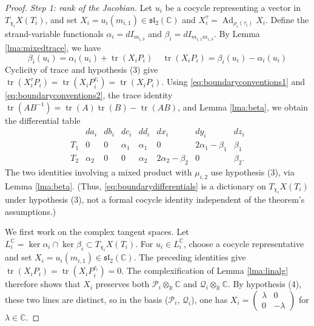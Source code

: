 \documentclass{article}
\DeclareMathOperator{\tr}{tr}
\newcommand{\Ad}{\operatorname{Ad}}
\newcommand{\sltwo}{\mathfrak{sl}_2}
\theoremstyle{plain}
\theoremstyle{definition}
\theoremstyle{plain}
\theoremstyle{plain}
\theoremstyle{plain}
\theoremstyle{remark}
\theoremstyle{remark}
\theoremstyle{plain}
\theoremstyle{plain}
\theoremstyle{plain}
\theoremstyle{plain}
\begin{document}
\begin{proof}
\emph{Step 1: rank of the Jacobian.} Let $u_i$ be a cocycle representing a vector in $T_{\chi_i}X(T_i)$, and set $X_i = u_i(m_{i, 1}) \in \sltwo(\mathbb C)$ and $X_i^\tau = \Ad_{\rho_i(\tau_i)}X_i$. Define the strand-variable functionals $\alpha_i = dI_{m_{i,3}}$ and $\beta_i = dI_{m_{i,1}m_{i,3}}$. By Lemma \ref{lma:mixedtrace}, we have 
\begin{equation*}
	\beta_i(u_i) = \alpha_i(u_i) + \tr(X_iP_i) \ \ \ \ \ \tr(X_iP_i) = \beta_i(u_i) - \alpha_i(u_i)
\end{equation*}
Cyclicity of trace and hypothesis (3) give $\tr(X_i^\tau P_i) = \tr(X_iP_i^{\tau_i}) = \tr(X_iP_i)$. Using \eqref{eq:boundaryconventions1} and \eqref{eq:boundaryconventions2}, the trace identity $\tr(AB^{-1}) = \tr(A)\tr(B)-\tr(AB)$, and Lemma \ref{lma:beta}, we obtain the differential table
\begin{equation}\label{eq:boundarydifferentials} \begin{array}{c|ccccccc} &da_i&db_i&dc_i&dd_i&dx_i&dy_i&dz_i\\ \hline T_1 &0&0&\alpha_1&\alpha_1 &0&2\alpha_1-\beta_1&\beta_1\\ T_2 &\alpha_2&0&0&\alpha_2 &2\alpha_2-\beta_2&0&\beta_2. \end{array} \end{equation}
The two identities involving a mixed product with $\mu_{i, 2}$ use hypothesis (3), via Lemma \ref{lma:beta}. (Thus, \eqref{eq:boundarydifferentials} is a dictionary on $T_{\chi_i}X(T_i)$ under hypothesis (3), not a formal cocycle identity independent of the theorem's assumptions.)

\medskip

We first work on the complex tangent spaces. Let $L_i^{\mathbb C} = \ker\alpha_i \cap \ker\beta_i \subset T_{\chi_i}X(T_i)$. For $u_i \in L_i^{\mathbb C}$, choose a cocycle representative and set $X_i = u_i(m_{i,1}) \in \sltwo(\mathbb C)$. The preceding identities give $\tr(X_iP_i) = \tr(X_iP_i^{\tau_i}) = 0$. The complexification of Lemma \ref{lma:linalg} therefore shows that $X_i$ preserves both $\mathcal P_i \otimes_{\mathbb R}\mathbb C$ and $\mathcal Q_i \otimes_{\mathbb R}\mathbb C$. By hypothesis (4), these two lines are distinct, so in the basis ($\mathcal P_i$, $\mathcal Q_i$), one has $X_i = \left(\begin{smallmatrix}\lambda & 0 \\ 0 & -\lambda\end{smallmatrix}\right)$ for $\lambda \in \mathbb C$. 


\end{proof}
\end{document}
